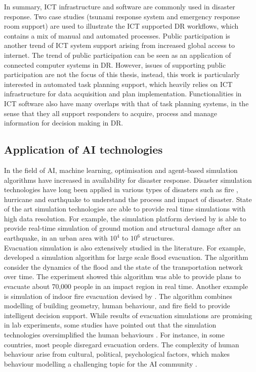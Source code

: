 In summary, \ac{ICT} infrastructure and software are commonly used in disaster response. Two case studies (tsunami response system and emergency response room support) are used to illustrate the \ac{ICT} supported \ac{DR} workflows, which contains a mix of manual and automated processes. Public participation is another trend of \ac{ICT} system support arising from increased global access to internet. The trend of public participation can be seen as an application of connected computer systems in \ac{DR}. However, issues of supporting public participation are not the focus of this thesis, instead, this work is particularly interested in automated task planning support, which heavily relies on \ac{ICT} infrastructure for data acquisition and plan implementation. Functionalities in \ac{ICT} software also have many overlaps with that of task planning systems, in the sense that they all support responders to acquire, process and manage information for decision making in \ac{DR}. \\


\subsection{Application of AI technologies}\label{sec:lraisupport}
In the field of \ac{AI}, machine learning, optimisation and agent-based simulation algorithms have increased in availability for disaster response. Disaster simulation technologies \citep{Okaya,Scerri2005} have long been applied in various types of disasters such as fire \citep{Tang2012}, hurricane \citep{Vickery2009} and earthquake \citep{Sobhaninejad2011} to understand the process and impact of disaster. State of the art simulation technologies are able to provide real time simulations with high data resolution. For example, the simulation platform devised by \citep{Sobhaninejad2011} is able to provide real-time simulation of ground motion and structural damage after an earthquake, in an urban area with $10^{4}$ to $10^{6}$ structures. \\

Evacuation simulation is also extensively studied in the literature. For example, \cite{Pillac2015} developed a simulation algorithm for large scale flood evacuation. The algorithm consider the dynamics of the flood and the state of the transportation network over time. The experiment showed this algorithm was able to provide plans to evacuate about 70,000 people in an impact region in real time.  Another example is simulation of indoor fire evacuation devised by \cite{Tang2012}.  The algorithm combines modelling of building geometry, human behaviour, and fire field to provide intelligent decision support. While results of evacuation simulations are promising in lab experiments, some studies have pointed out that the simulation technologies oversimplified the human behaviours \citep{Hentenryck2011}. For instance, in some countries, most people disregard evacuation orders. The complexity of human behaviour arise from cultural, political, psychological factors, which makes behaviour modelling a challenging topic for the \ac{AI} community \citep{Provitolo2011} . \\

